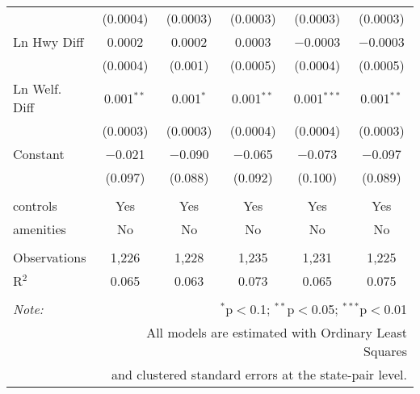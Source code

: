 \begin{table}[!htbp]
\begin{tabular}{@{\extracolsep{5pt}}lccccc}
  & (0.0004) & (0.0003) & (0.0003) & (0.0003) & (0.0003) \\ 
  Ln Hwy Diff & 0.0002 & 0.0002 & 0.0003 & $-$0.0003 & $-$0.0003 \\ 
  & (0.0004) & (0.001) & (0.0005) & (0.0004) & (0.0005) \\ 
  Ln Welf. Diff & 0.001$^{**}$ & 0.001$^{*}$ & 0.001$^{**}$ & 0.001$^{***}$ & 0.001$^{**}$ \\ 
  & (0.0003) & (0.0003) & (0.0004) & (0.0004) & (0.0003) \\ 
  Constant & $-$0.021 & $-$0.090 & $-$0.065 & $-$0.073 & $-$0.097 \\ 
  & (0.097) & (0.088) & (0.092) & (0.100) & (0.089) \\ 
 \hline \\[-1.8ex] 
controls & Yes & Yes & Yes & Yes & Yes \\ 
amenities & No & No & No & No & No \\ 
\hline \\[-1.8ex] 
Observations & 1,226 & 1,228 & 1,235 & 1,231 & 1,225 \\ 
R$^{2}$ & 0.065 & 0.063 & 0.073 & 0.065 & 0.075 \\ 
\hline 
\hline \\[-1.8ex] 
\textit{Note:}  & \multicolumn{5}{r}{$^{*}$p$<$0.1; $^{**}$p$<$0.05; $^{***}$p$<$0.01} \\ 
 & \multicolumn{5}{r}{All models are estimated with Ordinary Least Squares} \\ 
 & \multicolumn{5}{r}{and clustered standard errors at the state-pair level.} \\ 
\end{tabular} 
\end{table} 
